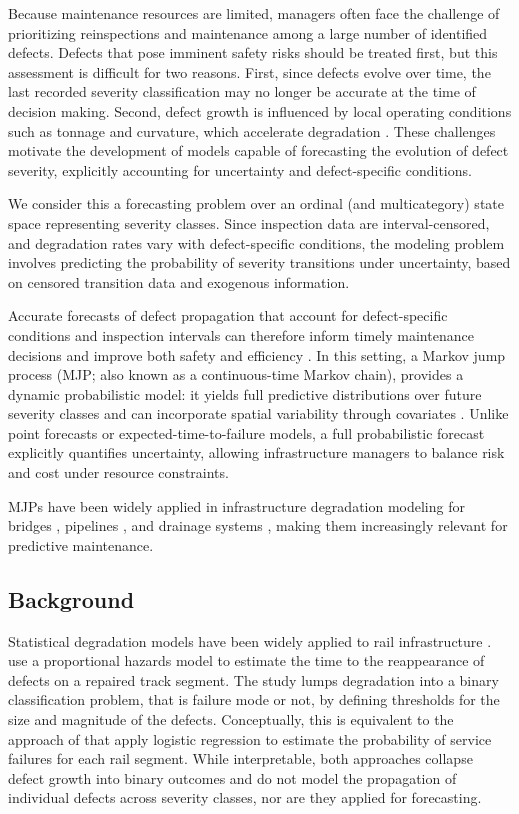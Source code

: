 \documentclass{article}
\begin{document}
Because maintenance resources are limited, managers often face the challenge of prioritizing reinspections and maintenance among a large number of identified defects.
Defects that pose imminent safety risks should be treated first, but this assessment is difficult for two reasons. 
First, since defects evolve over time, the last recorded severity classification may no longer be accurate at the time of decision making.
Second, defect growth is influenced by local operating conditions such as tonnage and curvature, which accelerate degradation \citep{bai2017a,Kumar2008HolisticSweden}.
These challenges motivate the development of models capable of forecasting the evolution of defect severity, explicitly accounting for uncertainty and defect-specific conditions.

We consider this a forecasting problem over an ordinal (and multicategory) state space representing severity classes. Since inspection data are interval-censored, and degradation rates vary with defect-specific conditions, the modeling problem involves predicting the probability of severity transitions under uncertainty, based on censored transition data and exogenous information.

Accurate forecasts of defect propagation that account for defect-specific conditions and inspection intervals can therefore inform timely maintenance decisions and improve both safety and efficiency \citep{Binder2023}. In this setting, a Markov jump process (MJP; also known as a continuous-time Markov chain), provides a dynamic probabilistic model: it yields full predictive distributions over future severity classes and can incorporate spatial variability through covariates \citep{bisgaard2024A}. Unlike point forecasts or expected-time-to-failure models, a full probabilistic forecast explicitly quantifies uncertainty, allowing infrastructure managers to balance risk and cost under resource constraints.

MJPs have been widely applied in infrastructure degradation modeling for bridges \citep{Mizutani2023RegimeSwitching}, pipelines \citep{JimenezRoa2024Nonhomogeneous}, and drainage systems \citep{Wu2021ConditionPrediction}, making them increasingly relevant for predictive maintenance. 

\subsection{Background} \label{sec:background}Statistical degradation models have been widely applied to rail infrastructure \citep{Davari2021AIndustry}.
\citet{ghofrani2019a} use a proportional hazards model to estimate the time to the reappearance of defects on a repaired track segment. The study lumps degradation into a binary classification problem, that is failure mode or not, by defining thresholds for the size and magnitude of the defects. Conceptually, this is equivalent to the approach of \citet{dick2003a} that apply logistic regression to estimate the probability of service failures for each rail segment. While interpretable, both approaches collapse defect growth into binary outcomes and do not model the propagation of individual defects across severity classes, nor are they applied for forecasting.
\end{document}
